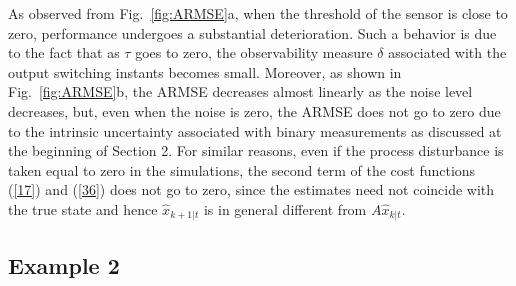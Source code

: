 \documentclass[11pt,journal,onecolumn]{IEEEtran}
\begin{document}
As observed from Fig.~\ref{fig:ARMSE}a, when the threshold of the sensor is close to zero, performance undergoes a substantial deterioration.
Such a behavior is due to the fact that as $\tau$ goes to zero, the observability measure $\delta$ associated with the output switching instants becomes small. Moreover, as shown in Fig.~\ref{fig:ARMSE}b, the ARMSE decreases almost linearly as the noise level decreases, but, even when the noise is zero, the ARMSE does not go to zero due to the intrinsic uncertainty associated with binary measurements as discussed at the beginning of Section 2.
For similar reasons, even if the process disturbance is taken equal to zero in the simulations, the second term of the cost functions (\ref{17}) and (\ref{36}) does not go to zero, since the estimates need not coincide with the true state
and hence $\hat x_{k+1|t}$ is in general different from $A \hat x_{k|t}$.

\subsection*{Example 2}
\end{document}
